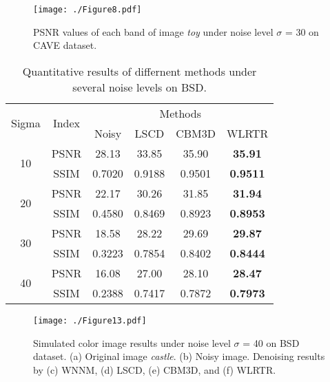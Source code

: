 \documentclass[twocolumn]{svjour3}          %
\begin{document}
\begin{figure}
\begin{center}
    \texttt{[image: ./Figure8.pdf]}
\end{center}
   \caption{PSNR values of each band of image \emph{toy} under noise level $\sigma$ = 30 on CAVE dataset.}
\label{PSNR of each band}
\end{figure}


\begin{table}[tbp]
\scriptsize
\renewcommand{\arraystretch}{1.2}
\centering
\caption{Quantitative results of differnent methods under several noise levels on BSD.}
\label{BSD_Quantitative}
\begin{tabular}{|c|c|c|c|c|c|}
\hline
\multirow{2}{*}{Sigma} & \multirow{2}{*}{Index} & \multicolumn{4}{c|}{Methods}      \\ \cline{3-6}
                       &                        & Noisy  & LSCD   & CBM3D  & WLRTR   \\ \hline
\multirow{2}{*}{10}    & PSNR                   & 28.13  & 33.85  & 35.90  & \textbf{35.91}  \\ \cline{2-6}
                       & SSIM                   & 0.7020 & 0.9188 & 0.9501 & \textbf{0.9511} \\ \hline
\multirow{2}{*}{20}    & PSNR                   & 22.17  & 30.26  & 31.85  & \textbf{31.94}  \\ \cline{2-6}
                       & SSIM                   & 0.4580 & 0.8469 & 0.8923 & \textbf{0.8953} \\ \hline
\multirow{2}{*}{30}    & PSNR                   & 18.58  & 28.22  & 29.69  & \textbf{29.87}  \\ \cline{2-6}
                       & SSIM                   & 0.3223 & 0.7854 & 0.8402 & \textbf{0.8444} \\ \hline
\multirow{2}{*}{40}    & PSNR                   & 16.08  & 27.00  & 28.10  & \textbf{28.47}  \\ \cline{2-6}
                       & SSIM                   & 0.2388 & 0.7417 & 0.7872 & \textbf{0.7973} \\ \hline
\end{tabular}
\end{table}

\begin{figure*}
\begin{center}
    \texttt{[image: ./Figure13.pdf]}
\end{center}
   \caption{Simulated color image results under noise level $\sigma$ = 40 on BSD dataset. (a) Original image \emph{castle}. (b) Noisy image. Denoising results by (c) WNNM, (d) LSCD, (e) CBM3D, and (f) WLRTR.}
\label{Simulated castle}
\end{figure*}
\end{document}
